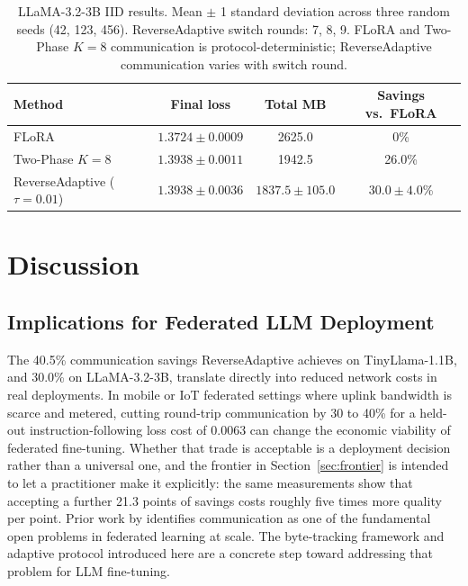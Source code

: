 \begin{table}[t]
\caption{LLaMA-3.2-3B IID results. Mean $\pm$ 1 standard deviation across three random seeds (42, 123, 456). ReverseAdaptive switch rounds: 7, 8, 9. FLoRA and Two-Phase $K{=}8$ communication is protocol-deterministic; ReverseAdaptive communication varies with switch round.}
\label{tab:llama_iid}
\begin{center}
\footnotesize
\setlength{\tabcolsep}{3pt}
\begin{tabular}{lccc}
\toprule
Method & Final loss & Total MB & Savings vs.\ FLoRA \\
\midrule
FLoRA & $1.3724 \pm 0.0009$ & 2625.0 & 0\% \\
Two-Phase $K{=}8$ & $1.3938 \pm 0.0011$ & 1942.5 & 26.0\% \\
ReverseAdaptive ($\tau{=}0.01$) & $1.3938 \pm 0.0036$ & $1837.5 \pm 105.0$ & $30.0 \pm 4.0$\% \\
\bottomrule
\end{tabular}
\end{center}
\end{table}

\section{Discussion}
\label{sec:discussion}

\subsection{Implications for Federated LLM Deployment}
The 40.5\% communication savings ReverseAdaptive achieves on TinyLlama-1.1B, and 30.0\% on LLaMA-3.2-3B, translate directly into reduced network costs in real deployments. In mobile or IoT federated settings where uplink bandwidth is scarce and metered, cutting round-trip communication by 30 to 40\% for a held-out instruction-following loss cost of 0.0063 can change the economic viability of federated fine-tuning. Whether that trade is acceptable is a deployment decision rather than a universal one, and the frontier in Section~\ref{sec:frontier} is intended to let a practitioner make it explicitly: the same measurements show that accepting a further 21.3 points of savings costs roughly five times more quality per point. Prior work by \citet{kairouz2021advances} identifies communication as one of the fundamental open problems in federated learning at scale. The byte-tracking framework and adaptive protocol introduced here are a concrete step toward addressing that problem for LLM fine-tuning.

